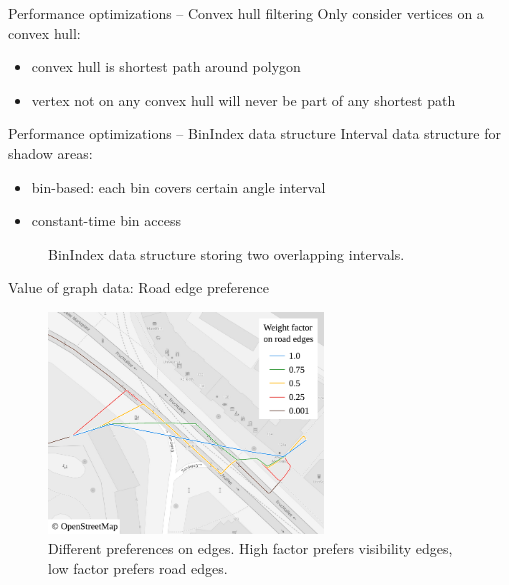 \documentclass[xcolor={x11names}]{beamer}
\renewcommand{\n}{\hfill\\[0.5ex]}
\newenvironment{figcenter}
{%
	\parskip=0pt%
	\par%
	\nopagebreak%
	\centering%
}%
{%
	\par%
	\noindent%
	\ignorespacesafterend%
}
\begin{document}
	\begin{frame}{Performance optimizations -- Convex hull filtering}
		Only consider vertices on a convex hull:\n
		\begin{itemize}
			\item convex hull is shortest path around polygon
			\item[\textrightarrow\hspace{-0.1cm}] vertex not on any convex hull will never be part of any shortest path
		\end{itemize}
	\end{frame}
	
	\begin{frame}{Performance optimizations -- BinIndex data structure}
		Interval data structure for shadow areas:\n
		\begin{itemize}
			\item bin-based: each bin covers certain angle interval
			\item constant-time bin access
		\end{itemize}
		\begin{figure}[b]
			\begin{figcenter}
				\scalebox{0.7}
				{
					
				}
			\end{figcenter}
			\caption{BinIndex data structure storing two overlapping intervals.}
		\end{figure}
	\end{frame}
	
	\begin{frame}{Value of graph data: Road edge preference}
		\begin{figure}[t]
			\begin{figcenter}
				\includegraphics[width=0.65\textwidth]{images/qgis-routing-city-weights.pdf}
			\end{figcenter}
			\caption{Different preferences on edges. High factor prefers visibility edges, low factor prefers road edges.}
		\end{figure}
	\end{frame}
	
\end{document}
